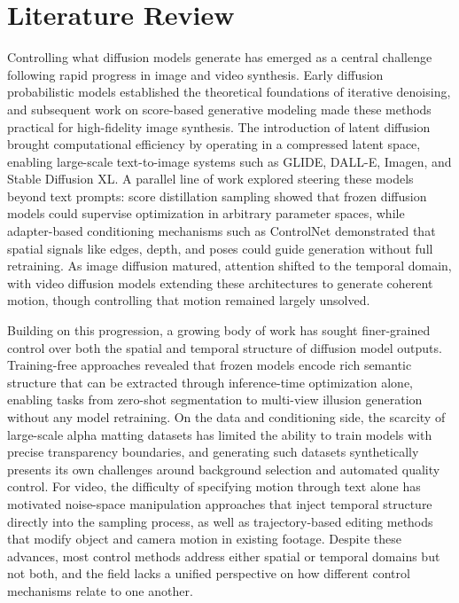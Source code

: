 \chapter{Literature Review}
\label{chapter:literature}

Controlling what diffusion models generate has emerged as a central challenge following rapid progress in image and video synthesis. Early diffusion probabilistic models established the theoretical foundations of iterative denoising, and subsequent work on score-based generative modeling made these methods practical for high-fidelity image synthesis. The introduction of latent diffusion brought computational efficiency by operating in a compressed latent space, enabling large-scale text-to-image systems such as GLIDE, DALL-E, Imagen, and Stable Diffusion XL. A parallel line of work explored steering these models beyond text prompts: score distillation sampling showed that frozen diffusion models could supervise optimization in arbitrary parameter spaces, while adapter-based conditioning mechanisms such as ControlNet demonstrated that spatial signals like edges, depth, and poses could guide generation without full retraining. As image diffusion matured, attention shifted to the temporal domain, with video diffusion models extending these architectures to generate coherent motion, though controlling that motion remained largely unsolved.

Building on this progression, a growing body of work has sought finer-grained control over both the spatial and temporal structure of diffusion model outputs. Training-free approaches revealed that frozen models encode rich semantic structure that can be extracted through inference-time optimization alone, enabling tasks from zero-shot segmentation to multi-view illusion generation without any model retraining. On the data and conditioning side, the scarcity of large-scale alpha matting datasets has limited the ability to train models with precise transparency boundaries, and generating such datasets synthetically presents its own challenges around background selection and automated quality control. For video, the difficulty of specifying motion through text alone has motivated noise-space manipulation approaches that inject temporal structure directly into the sampling process, as well as trajectory-based editing methods that modify object and camera motion in existing footage. Despite these advances, most control methods address either spatial or temporal domains but not both, and the field lacks a unified perspective on how different control mechanisms relate to one another.


